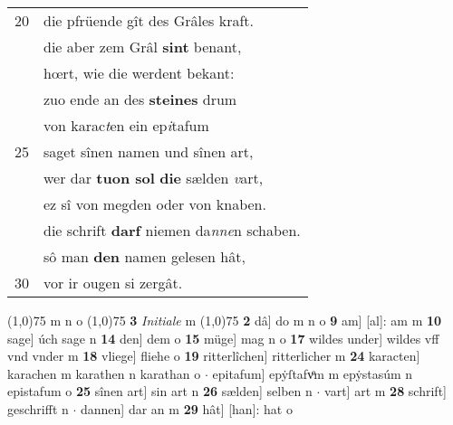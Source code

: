 \documentclass[8pt,a4paper,notitlepage]{article}
\begin{document}
\begin{table}[ht]
\begin{minipage}[t]{0.5\linewidth}
\begin{tabular}{rl}
20 & die pfrüende gît des Grâles kraft.\\ 
 & die aber zem Grâl \textbf{sint} benant,\\ 
 & hœrt, wie die werdent bekant:\\ 
 & zuo ende an des \textbf{steines} drum\\ 
 & von karac\textit{t}en ein ep\textit{i}tafum\\ 
25 & saget sînen namen und sînen art,\\ 
 & wer dar \textbf{tuon sol} \textbf{die} sælden \textit{v}art,\\ 
 & ez sî von megden oder von knaben.\\ 
 & die schrift \textbf{darf} niemen da\textit{nne}n schaben.\\ 
 & sô man \textbf{den} namen gelesen hât,\\ 
30 & vor ir ougen si zergât.\\ 
\end{tabular}
\scriptsize
\line(1,0){75} \newline
m n o \newline
\line(1,0){75} \newline
\textbf{3} \textit{Initiale} m  \newline
\line(1,0){75} \newline
\textbf{2} dâ] do m n o \textbf{9} am] [al]: am m \textbf{10} sage] úch sage n \textbf{14} den] dem o \textbf{15} müge] mag n o \textbf{17} wildes under] wildes vff vnd vnder m \textbf{18} vliege] fliehe o \textbf{19} ritterlîchen] ritterlicher m \textbf{24} karacten] karachen m karathen n karathan o  $\cdot$ epitafum] epẏſtafvͦm m epẏstasúm n epistafum o \textbf{25} sînen art] sin art n \textbf{26} sælden] selben n  $\cdot$ vart] art m \textbf{28} schrift] geschrifft n  $\cdot$ dannen] dar an m \textbf{29} hât] [han]: hat o \newline
\end{minipage}
\end{table}
\newpage
\end{document}
